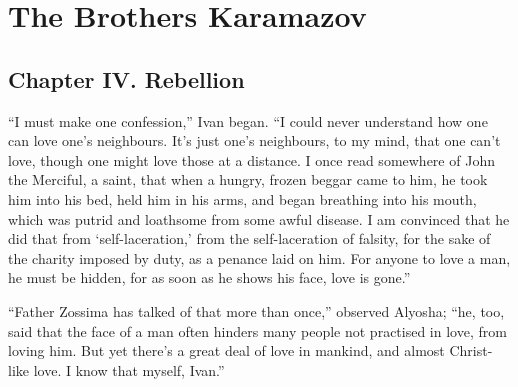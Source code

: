 
\author{Fyodor Dostoevsky}
\chapter[The Brothers Karamazov, excerpt]{The Brothers Karamazov}

\section*{Chapter IV. Rebellion}

``I must make one confession,'' Ivan began. ``I could never understand
how one can love one's neighbours. It's just one's neighbours, to my
mind, that one can't love, though one might  love those at a
distance. I once read somewhere of John the Merciful, a saint, that
when a hungry, frozen beggar came to him, he took him into his bed,
held him in his arms, and began breathing into his mouth, which was
putrid and loathsome from some awful disease. I am convinced that he
did that from `self-laceration,' from the self-laceration of falsity,
for the sake of the charity imposed by duty, as a penance laid on him.
For anyone to love a man, he must be hidden, for as soon as he shows
his face, love is gone.''

``Father Zossima has talked of that more than once,'' observed
Alyosha; ``he, too, said that the face of a man often hinders many
people not practised in love, from loving him. But yet there's a great
deal of love in mankind, and almost Christ-like love. I know that
myself, Ivan.''

